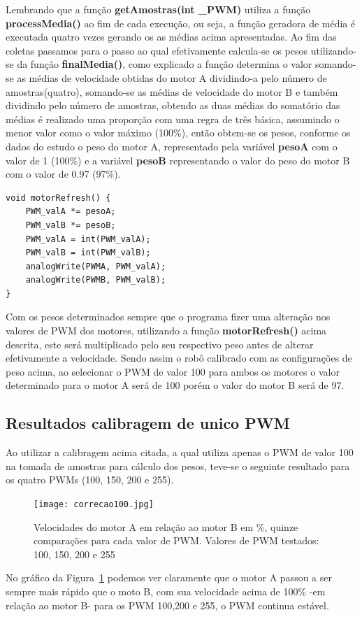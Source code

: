 \documentclass[a4paper,12pt,portuguese]{ufms-cpcx}
\begin{document}
Lembrando que a função \textbf{getAmostras(int \_PWM)} utiliza a função \textbf{processMedia()} ao fim de cada execução, ou seja, a função geradora de média é executada quatro vezes gerando os as médias acima apresentadas.
Ao fim das coletas passamos para o passo ao qual efetivamente calcula-se os pesos utilizando-se da função \textbf{finalMedia()}, como explicado a função determina o valor somando-se as médias de velocidade obtidas do motor A dividindo-a pelo número de amostras(quatro), somando-se as médias de velocidade do motor B e também dividindo pelo número de amostras, obtendo as duas médias do somatório das médias é realizado uma proporção com uma regra de três básica, assumindo o menor valor como o valor máximo (100\%), então obtem-se os pesos, conforme os dados do estudo o peso do motor A, representado pela variável \textbf{pesoA} com o valor de 1 (100\%) e a variável \textbf{pesoB} representando o valor do peso do motor B com o valor de 0.97 (97\%).

\begin{lstlisting}
void motorRefresh() {
	PWM_valA *= pesoA;
	PWM_valB *= pesoB;
	PWM_valA = int(PWM_valA);
	PWM_valB = int(PWM_valB);
	analogWrite(PWMA, PWM_valA);
	analogWrite(PWMB, PWM_valB);
}
\end{lstlisting}

Com os pesos determinados sempre que o programa fizer uma alteração nos valores de PWM dos motores, utilizando a função \textbf{motorRefresh()} acima descrita, este será multiplicado pelo seu respectivo peso antes de alterar efetivamente a velocidade. Sendo assim o robô calibrado com as configurações de peso acima, ao selecionar o PWM de valor 100 para ambos os motores o valor determinado para o motor A será de 100 porém o valor do motor B será de 97.

\subsection*{Resultados calibragem de unico PWM}
Ao utilizar a calibragem acima citada, a qual utiliza apenas o PWM de valor 100 na tomada de amostras para cálculo dos pesos, teve-se o seguinte resultado para os quatro PWMs (100, 150, 200 e 255).
\begin{figure}[H]	
	\centering
	\texttt{[image: correcao100.jpg]}
	\caption{Velocidades do motor A em relação ao motor B em \%, quinze comparações para cada valor de PWM. Valores de PWM testados: 100, 150, 200 e 255}
	\label{fig:correcao100}
\end{figure}
No gráfico da Figura~\ref{fig:correcao100} podemos ver claramente que o motor A passou a ser sempre mais rápido que o moto B, com sua velocidade acima de 100\% -em relação ao motor B- para os PWM 100,200 e 255, o PWM continua estável.
\end{document}
